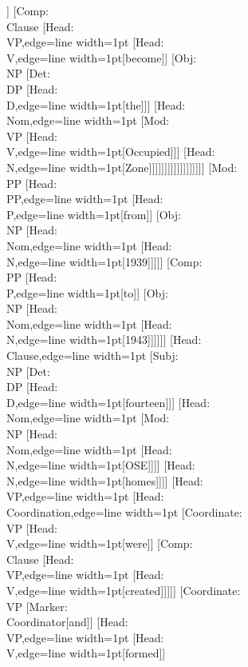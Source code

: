 \documentclass[tikz,border=12pt]{standalone}
\newcommand{\Node}[2]{\small\textsf{#1:}\\{#2}}
\begin{document}
\begin{forest}
                                                    [\Node{Head}{V},edge={line width=1pt}[would]]
                                                    [\Node{Comp}{Clause}
                                                        [\Node{Head}{VP},edge={line width=1pt}
                                                            [\Node{Head}{V},edge={line width=1pt}[become]]
                                                            [\Node{Obj}{NP}
                                                                [\Node{Det}{DP}
                                                                    [\Node{Head}{D},edge={line width=1pt}[the]]]
                                                                [\Node{Head}{Nom},edge={line width=1pt}
                                                                    [\Node{Mod}{VP}
                                                                        [\Node{Head}{V},edge={line width=1pt}[Occupied]]]
                                                                    [\Node{Head}{N},edge={line width=1pt}[Zone]]]]]]]]]]]]]]]]]]
    [\Node{Mod}{PP}
        [\Node{Head}{PP},edge={line width=1pt}
            [\Node{Head}{P},edge={line width=1pt}[from]]
            [\Node{Obj}{NP}
                [\Node{Head}{Nom},edge={line width=1pt}
                    [\Node{Head}{N},edge={line width=1pt}[1939]]]]]
        [\Node{Comp}{PP}
            [\Node{Head}{P},edge={line width=1pt}[to]]
            [\Node{Obj}{NP}
                [\Node{Head}{Nom},edge={line width=1pt}
                    [\Node{Head}{N},edge={line width=1pt}[1943]]]]]]
    [\Node{Head}{Clause},edge={line width=1pt}
        [\Node{Subj}{NP}
            [\Node{Det}{DP}
                [\Node{Head}{D},edge={line width=1pt}[fourteen]]]
            [\Node{Head}{Nom},edge={line width=1pt}
                [\Node{Mod}{NP}
                    [\Node{Head}{Nom},edge={line width=1pt}
                        [\Node{Head}{N},edge={line width=1pt}[OSE]]]]
                [\Node{Head}{N},edge={line width=1pt}[homes]]]]
        [\Node{Head}{VP},edge={line width=1pt}
            [\Node{Head}{Coordination},edge={line width=1pt}
                [\Node{Coordinate}{VP}
                    [\Node{Head}{V},edge={line width=1pt}[were]]
                    [\Node{Comp}{Clause}
                        [\Node{Head}{VP},edge={line width=1pt}
                            [\Node{Head}{V},edge={line width=1pt}[created]]]]]
                [\Node{Coordinate}{VP}
                    [\Node{Marker}{Coordinator}[and]]
                    [\Node{Head}{VP},edge={line width=1pt}
                        [\Node{Head}{V},edge={line width=1pt}[formed]]

\end{forest}
\end{document}
